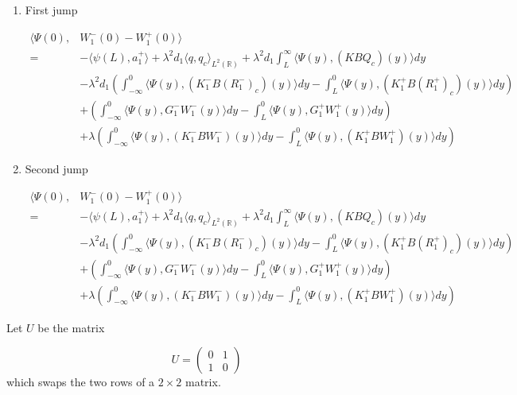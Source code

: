 \documentclass[12pt]{article}
\def\R{{\mathbb R}}
\begin{document}
\begin{enumerate}

\item First jump

\begin{align*}
\langle \Psi(0), &W_1^-(0) - W_1^+(0) \rangle \\
= &-\langle \psi(L), a_{1}^+\rangle + \lambda^2 d_1 \langle q, q_c \rangle_{L^2(\R)} + \lambda^2 d_1 \int_L^\infty \langle \Psi(y), (K B Q_c)(y) \rangle dy \\
&-\lambda^2 d_1 \left( \int_{-\infty}^0 \langle \Psi(y), (K_1^- B (R_1^-)_c)(y) \rangle dy - \int_{L}^0 \langle \Psi(y), (K_1^+ B (R_1^+)_c)(y) \rangle dy \right) \\
&+\left( \int_{-\infty}^0 \langle \Psi(y), G_1^- W_1^-(y) \rangle dy - \int_{L}^0 \langle \Psi(y), G_1^+ W_1^+(y) \rangle dy \right) \\
&+ \lambda\left( \int_{-\infty}^0 \langle \Psi(y), (K_1^- B W_1^-)(y) \rangle dy - \int_{L}^0 \langle \Psi(y), (K_1^+ B W_1^+)(y) \rangle dy \right) 
\end{align*}

\item Second jump

\begin{align*}
\langle \Psi(0), &W_1^-(0) - W_1^+(0) \rangle \\
= &-\langle \psi(L), a_{1}^+\rangle + \lambda^2 d_1 \langle q, q_c \rangle_{L^2(\R)} + \lambda^2 d_1 \int_L^\infty \langle \Psi(y), (K B Q_c)(y) \rangle dy \\
&-\lambda^2 d_1 \left( \int_{-\infty}^0 \langle \Psi(y), (K_1^- B (R_1^-)_c)(y) \rangle dy - \int_{L}^0 \langle \Psi(y), (K_1^+ B (R_1^+)_c)(y) \rangle dy \right) \\
&+\left( \int_{-\infty}^0 \langle \Psi(y), G_1^- W_1^-(y) \rangle dy - \int_{L}^0 \langle \Psi(y), G_1^+ W_1^+(y) \rangle dy \right) \\
&+ \lambda\left( \int_{-\infty}^0 \langle \Psi(y), (K_1^- B W_1^-)(y) \rangle dy - \int_{L}^0 \langle \Psi(y), (K_1^+ B W_1^+)(y) \rangle dy \right) 
\end{align*}

\end{enumerate}



Let $U$ be the matrix

\[
U = \begin{pmatrix}0 & 1\\ 1 &0\end{pmatrix}
\]
which swaps the two rows of a $2\times2$ matrix.\\
\end{document}
